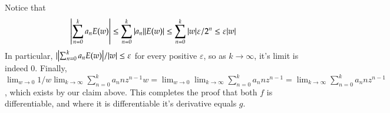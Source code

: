 \documentclass[12pt]{article}
\def \ve{\varepsilon}
\theoremstyle{definition}
\theoremstyle{remark}
\begin{document}
\begin{enumerate}[leftmargin=\labelsep]
		Notice that
		\begin{align*}
		 \qty|\sum_{n=0}^k a_nE(w)| \leq \sum_{n = 0}^k |a_n||E(w)| \leq \sum_{n = 0}^k |w| \ve / 2^n \leq \ve|w|
		\end{align*}
		In particular, $|\qty|\sum_{n=0}^k a_nE(w)|/|w| \leq \ve$ for every positive $\ve$, so as $k \to \infty$, it's limit is indeed 0. Finally, $\lim_{w \to 0} 1/w \lim_{k \to \infty} \sum_{n=0}^k a_nnz^{n-1} w = \lim_{w \to 0} \lim_{k \to \infty} \sum_{n=0}^k a_nnz^{n-1} = \lim_{k \to \infty} \sum_{n=0}^k a_nnz^{n-1}$, which exists by our claim above. This completes the proof that both $f$ is differentiable, and where it is differentiable it's derivative equals $g$.
	\end{enumerate}
\end{document}
